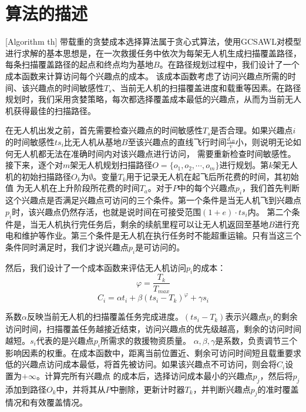 \section{算法的描述}[Algorithm th]
带载重的贪婪成本选择算法属于贪心式算法，使用GCSAWL对模型进行求解的基本思想是，在一次救援任务中依次为每架无人机生成扫描覆盖路径，每条扫描覆盖路径的起点和终点均为基地$B$。在路径规划过程中，我们设计了一个成本函数来计算访问每个兴趣点的成本。
该成本函数考虑了访问兴趣点所需的时间、该兴趣点的时间敏感性$T_s$、当前无人机的扫描覆盖进度和载重等因素。在路径规划时，我们采用贪婪策略，每次都选择覆盖成本最低的兴趣点，从而为当前无人机获得最佳的扫描路径。


在无人机出发之前，首先需要检查兴趣点的时间敏感性$T_s$是否合理。如果兴趣点$i$的时间敏感性$ts_i$比无人机从基地$B$至该兴趣点的直线飞行时间$\frac{d_{iB}}{v}$小，则说明无论如何无人机都无法在准确时间内对该兴趣点进行访问，
需要重新检查时间敏感性。接下来，逐个对$m$架无人机规划扫描路径$O=\lbrace o_1, o_2, \cdots ,o_m \rbrace$进行规划。第$k$架无人机的初始扫描路径$O_k$为$\emptyset$。变量$T_k$用于记录无人机在起飞后所花费的时间，其初始值
为无人机在上升阶段所花费的时间$T_a$。对于$P$中的每个兴趣点$p_i$，我们首先判断这个兴趣点是否满足兴趣点可访问的三个条件。第一个条件是当无人机飞到兴趣点$p_i$时，该兴趣点仍然存活，也就是说时间在可接受范围$(1+e) \cdot ts_i$内。
第二个条件是，当无人机执行完任务后，剩余的续航里程可以让无人机返回至基地$B$进行充电和维护等作业。第三个条件是无人机在执行任务时不能超重运输。只有当这三个条件同时满足时，我们才说兴趣点$p_i$是可访问的。


然后，我们设计了一个成本函数来评估无人机访问$p_i$的成本：
\begin{equation}
	\varphi = \frac{T_k}{T_{max}}
\end{equation}
\begin{equation}
	C_i = \alpha t_i + \beta (ts_i - T_k)^\varphi + \gamma s_i
\end{equation}

系数$\alpha$反映当前无人机的扫描覆盖任务完成进度。$(ts_i - T_k)$表示兴趣点$p_i$的剩余访问时间，扫描覆盖任务越接近结束，访问兴趣点的优先级越高，剩余的访问时间越短。$s_i$代表的是兴趣点$p_i$所需求的救援物资质量。
$\alpha,\beta,\gamma$是系数，负责调节三个影响因素的权重。在成本函数中，距离当前位置近、剩余可访问时间短且载重要求低的兴趣点访问成本最低，将首先被访问。如果该兴趣点不可访问，则会将$C_i$设置为$+\infty$。计算完所有兴趣点
的成本后，选择访问成本最小的兴趣点$p_j$，然后将$p_j$添加到路径$O_k$中，并将其从$P$中删除，更新计时器$T_k$，并判断兴趣点$p_j$的准时覆盖情况和有效覆盖情况。


